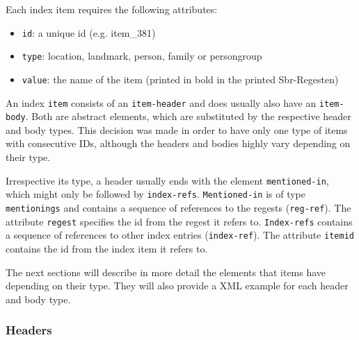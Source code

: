 Each index item requires the following attributes:
\begin{itemize}
\item \texttt{id}: a unique id (e.g. item\_381)
\item \texttt{type}: location, landmark, person, family or persongroup
\item \texttt{value}: the name of the item (printed in bold in the
  printed Sbr-Regesten)
\end{itemize}

An index \texttt{item} consists of an \texttt{item-header} and does
usually also have an \texttt{item-body}. Both are abstract elements,
which are substituted by the respective header and body types. This
decision was made in order to have only one type of items with
consecutive IDs, although the headers and bodies highly vary depending
on their type.

Irrespective its type, a header usually ends with the element
\texttt{mentioned-in}, which might only be followed by
\texttt{index-refs}. \texttt{Mentioned-in} is of type
\texttt{mentionings} and contains a sequence of references to the
regests (\texttt{reg-ref}). The attribute \texttt{regest} specifies
the id from the regest it refers to. \texttt{Index-refs} contains a
sequence of references to other index entries (\texttt{index-ref}).
The attribute \texttt{itemid} contains the id from the index item it
refers to.

The next sections will describe in more detail the elements that items
have depending on their type. They will also provide a XML example for
each header and body type.

\subsubsection{Headers}
\label{header-xml}

